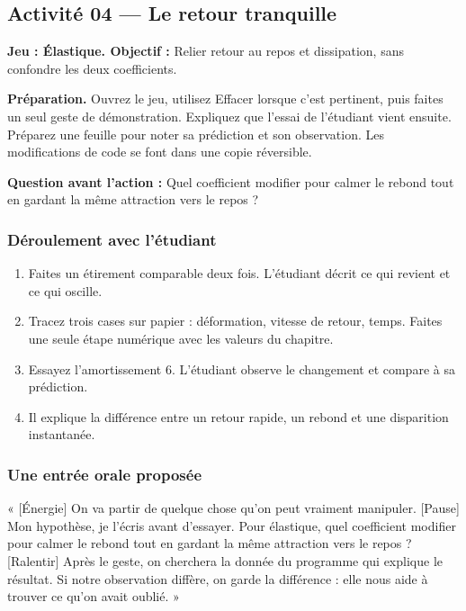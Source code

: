 \documentclass[
  canadien,
  11pt,
  letterpaper,
]{article}
\providecommand{\tightlist}{%
  \setlength{\itemsep}{0pt}\setlength{\parskip}{0pt}}
\begin{document}
\subsection{Activité 04 --- Le retour
tranquille}\label{activituxe9-04-le-retour-tranquille}

\textbf{Jeu : Élastique. Objectif :} Relier retour au repos et
dissipation, sans confondre les deux coefficients.

\textbf{Préparation.} Ouvrez le jeu, utilisez Effacer lorsque c'est
pertinent, puis faites un seul geste de démonstration. Expliquez que
l'essai de l'étudiant vient ensuite. Préparez une feuille pour noter sa
prédiction et son observation. Les modifications de code se font dans
une copie réversible.

\textbf{Question avant l'action :} Quel coefficient modifier pour calmer
le rebond tout en gardant la même attraction vers le repos ?

\subsubsection{Déroulement avec
l'étudiant}\label{duxe9roulement-avec-luxe9tudiant-3}

\begin{enumerate}
\def\labelenumi{\arabic{enumi}.}
\tightlist
\item
  Faites un étirement comparable deux fois. L'étudiant décrit ce qui
  revient et ce qui oscille.
\item
  Tracez trois cases sur papier : déformation, vitesse de retour, temps.
  Faites une seule étape numérique avec les valeurs du chapitre.
\item
  Essayez l'amortissement 6. L'étudiant observe le changement et compare
  à sa prédiction.
\item
  Il explique la différence entre un retour rapide, un rebond et une
  disparition instantanée.
\end{enumerate}

\subsubsection{Une entrée orale
proposée}\label{une-entruxe9e-orale-proposuxe9e-3}

« {[}Énergie{]} On va partir de quelque chose qu'on peut vraiment
manipuler. {[}Pause{]} Mon hypothèse, je l'écris avant d'essayer. Pour
élastique, quel coefficient modifier pour calmer le rebond tout en
gardant la même attraction vers le repos ? {[}Ralentir{]} Après le
geste, on cherchera la donnée du programme qui explique le résultat. Si
notre observation diffère, on garde la différence : elle nous aide à
trouver ce qu'on avait oublié. »
\end{document}
